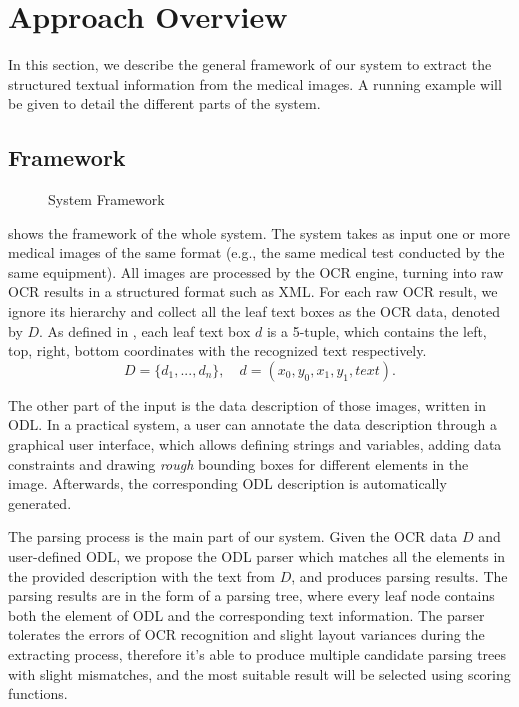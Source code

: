 \section{Approach Overview}
\label{sec:appro}

In this section, we describe the general framework of our system
to extract the structured textual information from the medical images.
A running example will be given to detail the different parts of the system.

\subsection{Framework}
\begin{figure*}[ht]
\centering
{}
\caption{System Framework}
\label{fig:framework}
\end{figure*}

 shows the framework of the whole system.
The system takes as input one or more medical images of the same format
(e.g., the same medical test conducted by the same equipment).
All images are processed by the OCR engine,
turning into raw OCR results in a structured format such as XML.
For each raw OCR result,
we ignore its hierarchy and collect all the leaf text boxes as the OCR data,
denoted by $D$.
As defined in , each leaf text box $d$ is a 5-tuple,
which contains the left, top, right, bottom coordinates
with the recognized text respectively.
\begin{equation}
  D = \{d_1, ..., d_n\}, \quad d = (x_0, y_0, x_1, y_1, text).
\label{equ:data}
\end{equation}

The other part of the input is the data description of those images,
written in ODL.
In a practical system, a user can annotate the data description through
a graphical user interface, which allows defining strings and variables,
adding data constraints and drawing \textit{rough} bounding boxes for different
elements in the image.
Afterwards, the corresponding ODL description is automatically generated.

The parsing process is the main part of our system.
Given the OCR data $D$ and user-defined ODL, we propose the ODL parser
which matches all the elements in the provided description
with the text from $D$, and produces parsing results.
The parsing results are in the form of a parsing tree, where every leaf node
contains both the element of ODL and the corresponding text information.
The parser tolerates the errors of OCR recognition and slight layout variances
during the extracting process,
therefore it's able to produce multiple candidate parsing trees
with slight mismatches,
and the most suitable result will be selected using scoring functions.

